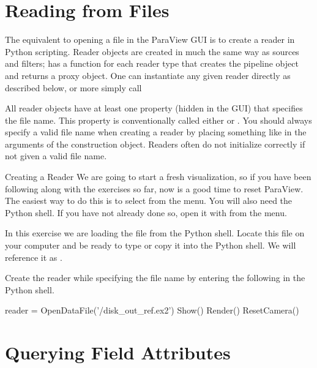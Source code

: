 \section{Reading from Files}
\label{sec:ReadingFromFiles}

The equivalent to opening a file in the ParaView GUI is to create a reader
in Python scripting.  Reader objects are created in much the same way as
sources and filters;  has a function for each
reader type that creates the pipeline object and returns a
proxy object. One can instantiate any given reader
directly as described below, or more simply call 

All reader objects have at least one property (hidden in the GUI) that
specifies the file name.  This property is conventionally called either
 or .  You should always specify a valid
file name when creating a reader by placing something like
 in the arguments of the construction
object.  Readers often do not initialize correctly if not given a valid
file name.

\begin{exercise}{Creating a Reader}
  \label{ex:CreatingAReader}%
  We are going to start a fresh visualization, so if you have been
  following along with the exercises so far, now is a good time to reset
  ParaView.  The easiest way to do this is to select  \ra
   from the menu.  You will also need the Python shell.
  If you have not already done so, open it with  \ra {} from the menu.

  In this exercise we are loading the  file from
  the Python shell.  Locate this file on your computer and be ready to type
  or copy it into the Python shell.  We will reference it as
  .

  Create the reader while specifying the file name by entering the following
  in the Python shell.

  \begin{pythonpluscommands}
reader = OpenDataFile('/disk_out_ref.ex2')
Show()
Render()
ResetCamera()
  \end{pythonpluscommands}
\end{exercise}


\section{Querying Field Attributes}
\label{sec:QueryingFieldAttributes}

